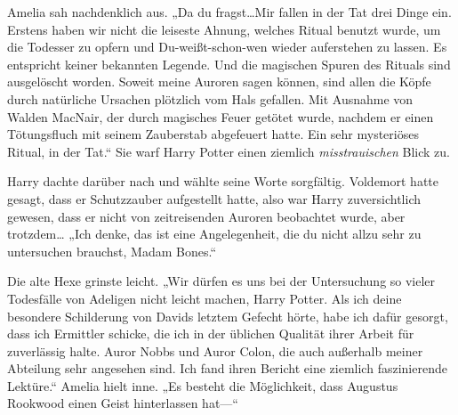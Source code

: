 Amelia sah nachdenklich aus.
„Da du fragst…Mir fallen in der Tat drei Dinge ein. Erstens haben wir nicht die leiseste Ahnung, welches Ritual benutzt wurde, um die Todesser zu opfern und Du-weißt-schon-wen wieder auferstehen zu lassen. Es entspricht keiner bekannten Legende. Und die magischen Spuren des Rituals sind ausgelöscht worden. Soweit meine Auroren sagen können, sind allen die Köpfe durch natürliche Ursachen plötzlich vom Hals gefallen. Mit Ausnahme von Walden MacNair, der durch magisches Feuer getötet wurde, nachdem er einen Tötungsfluch mit seinem Zauberstab abgefeuert hatte. Ein sehr mysteriöses Ritual, in der Tat.“
Sie warf Harry Potter einen ziemlich \emph{misstrauischen} Blick zu.

Harry dachte darüber nach und wählte seine Worte sorgfältig. Voldemort hatte gesagt, dass er Schutzzauber aufgestellt hatte, also war Harry zuversichtlich gewesen, dass er nicht von zeitreisenden Auroren beobachtet wurde, aber trotzdem…
„Ich denke, das ist eine Angelegenheit, die du nicht allzu sehr zu untersuchen brauchst, Madam Bones.“

Die alte Hexe grinste leicht.
„Wir dürfen es uns bei der Untersuchung so vieler Todesfälle von Adeligen nicht leicht machen, Harry Potter. Als ich deine besondere Schilderung von Davids letztem Gefecht hörte, habe ich dafür gesorgt, dass ich Ermittler schicke, die ich in der üblichen Qualität ihrer Arbeit für zuverlässig halte. Auror Nobbs und Auror Colon, die auch außerhalb meiner Abteilung sehr angesehen sind. Ich fand ihren Bericht eine ziemlich faszinierende Lektüre.“
Amelia hielt inne.
„Es besteht die Möglichkeit, dass Augustus Rookwood einen Geist hinterlassen hat—“

